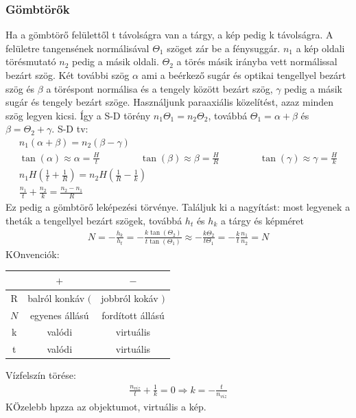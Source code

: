 \documentclass{article}
\begin{document}
\subsubsection{Gömbtörők}
Ha a gömbtörő felülettől t távolságra van a tárgy, a kép pedig k távolságra. A felületre tangensének normálisával $\Theta_1$ szöget zár be a fénysuggár. $n_1$ a kép oldali törésmutató $n_2$ pedig a másik oldali. $\Theta_2$ a törés másik irányba vett normálissal bezárt szög. Két további szög $\alpha$ ami a beérkező sugár és optikai tengellyel bezárt szög és $\beta$ a töréspont normálisa és a tengely között bezárt szög, $\gamma$ pedig a másik sugár és tengely bezárt szöge. Használjunk paraaxiális közelítést, azaz minden szög legyen kicsi. Így a S-D törény $n_1 \Theta_1 = n_2 \Theta_2$, továbbá $\Theta_1 = \alpha+\beta$ és $\beta = \Theta_2 + \gamma$. S-D tv:
\begin{gather*}
n_1(\alpha+ \beta) = n_2 (\beta-\gamma) \\
\tan(\alpha) \approx \alpha = \frac{H}{t} \hspace{50pt} \tan(\beta) \approx \beta = \frac{H}{R} \hspace{50pt} \tan(\gamma) \approx \gamma = \frac{H}{k} \\
n_1 H \left( \frac{1}{t} + \frac{1}{R} \right) = n_2 H \left( \frac{1}{R} - \frac{1}{k}\right) \\
\frac{n_1}{t} + \frac{n_2}{k} = \frac{n_2-n_1}{R}
\end{gather*}
Ez pedig a gömbtörő leképezési törvénye. Találjuk ki a nagyítást: most legyenek a theták a tengellyel bezárt szögek, továbbá $h_t$ és $h_k$ a tárgy és képméret
\begin{gather*}
N=-\frac{h_k}{h_t} = -\frac{k \tan(\Theta_2)}{t \tan(\Theta_1)} \approx -\frac{k\Theta_2}{t \Theta_1} = -\frac{k}{t} \frac{n_1}{n_2} = N
\end{gather*}
KOnvenciók:
\begin{center}
\begin{tabular}{c|cc}
& $\boxed{+}$ & $\boxed{-}$ \\ \hline 
R & balról konkáv $\boxed{(}$ & jobbról kokáv $\boxed{)}$\\
$N$ & egyenes állású & fordított állású \\
k & valódi & virtuális \\
t & valódi & virtuális
\end{tabular}
\end{center}
Vízfelszín törése:
\begin{gather*}
\frac{n_{viz}}{t} + \frac{1}{k} = 0 \Rightarrow k= -\frac{t}{n_{viz}}
\end{gather*}
KÖzelebb hpzza az objektumot, virtuális a kép.
\end{document}
